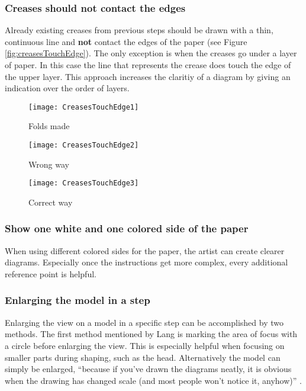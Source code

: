 \subsubsection*{Creases should not contact the edges}
Already existing creases from previous steps should be drawn with a thin, continuous line and \textbf{not} contact the edges of the paper (see Figure \ref{fig:creasesTouchEdge}). The only exception is when the creases go under a layer of paper. In this case the line that represents the crease does touch the edge of the upper layer. This approach increases the claritiy of a diagram by giving an indication over the order of layers.
\begin{figure*}[htbp]
    \centering
    \begin{subfigure}{0.3\textwidth}
        \texttt{[image: CreasesTouchEdge1]}
        \caption{Folds made}
        \label{fig:creasesTouchEdge1}
    \end{subfigure}
    \begin{subfigure}{0.3\textwidth}
        \texttt{[image: CreasesTouchEdge2]}
        \caption{Wrong way}
        \label{fig:creasesTouchEdge2}
    \end{subfigure}
    \begin{subfigure}{0.3\textwidth}
        \texttt{[image: CreasesTouchEdge3]}
        \caption{Correct way}
        \label{fig:creasesTouchEdge3}
    \end{subfigure}
    \caption{How to draw existing creases}\label{fig:creasesTouchEdge}
\end{figure*}

\subsubsection*{Show one white and one colored side of the paper}
When using different colored sides for the paper, the artist can create clearer diagrams. Especially once the instructions get more complex, every additional reference point is helpful.

\subsubsection*{Enlarging the model in a step}
Enlarging the view on a model in a specific step can be accomplished by two methods. The first method mentioned by Lang is marking the area of focus with a circle before enlarging the view. This is especially helpful when focusing on smaller parts during shaping, such as the head. Alternatively the model can simply be enlarged, \enquote{because if you've drawn the diagrams neatly, it is obvious when the drawing has changed scale (and most people won't notice it, anyhow)} \cite{Lang}.

